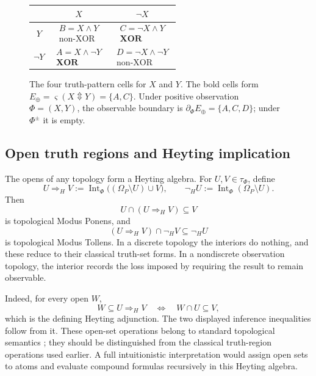 \documentclass[11pt]{article}
\theoremstyle{definition}
\theoremstyle{plain}
\theoremstyle{remark}
\newcommand{\Int}{\operatorname{Int}}
\newcommand{\bd}{\partial}
\begin{document}
\begin{figure}[!ht]
\centering
\renewcommand{\arraystretch}{1.35}
\setlength{\tabcolsep}{13pt}
\begin{tabular}{c|c|c}
 & $X$ & $\neg X$ \\\hline
$Y$ &
$\begin{gathered}B=X\wedge Y\\\text{non-XOR}\end{gathered}$ &
$\begin{gathered}C=\neg X\wedge Y\\\mathbf{XOR}\end{gathered}$ \\\hline
$\neg Y$ &
$\begin{gathered}A=X\wedge\neg Y\\\mathbf{XOR}\end{gathered}$ &
$\begin{gathered}D=\neg X\wedge\neg Y\\\text{non-XOR}\end{gathered}$
\end{tabular}
\caption{The four truth-pattern cells for $X$ and $Y$.  The bold cells form
$E_\oplus=\varsigma(X\Updownarrow Y)=\{A,C\}$.  Under positive observation
$\Phi=(X,Y)$, the observable boundary is $\bd_\Phi E_\oplus=\{A,C,D\}$;
under $\Phi^{\pm}$ it is empty.}
\label{fig:xor-four-cell}
\end{figure}

\subsection{Open truth regions and Heyting implication}

The opens of any topology form a Heyting algebra.  For
$U,V\in\tau_\Phi$, define
\[
 U\Rightarrow_H V
 :=\Int_\Phi\bigl((\Omega_P\setminus U)\cup V\bigr),
 \qquad
 \neg_H U:=\Int_\Phi(\Omega_P\setminus U).
\]
Then
\[
 U\cap(U\Rightarrow_H V)\subseteq V
\]
is topological Modus Ponens, and
\[
 (U\Rightarrow_H V)\cap\neg_H V\subseteq\neg_H U
\]
is topological Modus Tollens.  In a discrete topology the interiors do nothing,
and these reduce to their classical truth-set forms.  In a nondiscrete
observation topology, the interior records the loss imposed by requiring the
result to remain observable.

Indeed, for every open $W$,
\[
 W\subseteq U\Rightarrow_H V
 \quad\Longleftrightarrow\quad
 W\cap U\subseteq V,
\]
which is the defining Heyting adjunction.  The two displayed inference
inequalities follow from it.  These open-set operations belong to standard
topological semantics \cite{McKinseyTarski1944,Vickers2007}; they should be
distinguished from the classical truth-region operations used earlier.  A full intuitionistic
interpretation would assign open sets to atoms and evaluate compound formulas
recursively in this Heyting algebra.
\end{document}
